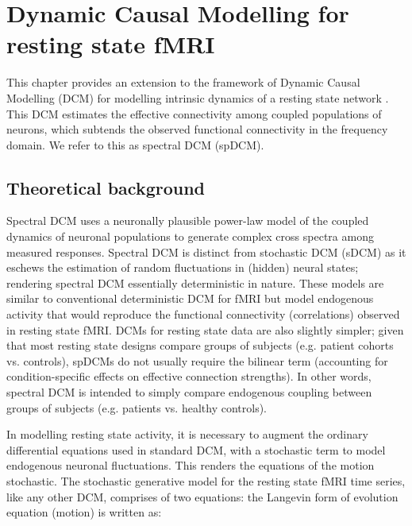 \chapter{Dynamic Causal Modelling for resting state fMRI \label{Chap:DCM_rsfmri}}

This chapter provides an extension to the framework of Dynamic Causal Modelling (DCM) for modelling intrinsic dynamics of a resting state network \cite{rsDCM2014,rsDCM2015}. This DCM estimates the effective connectivity among coupled populations of neurons, which subtends the observed functional connectivity in the frequency domain. We refer to this as spectral DCM (spDCM).

\section{Theoretical background}
Spectral DCM uses a neuronally plausible power-law model of the coupled dynamics of neuronal populations to generate complex cross spectra among measured responses. Spectral DCM is distinct from stochastic DCM (sDCM) \cite{stocDCM2011} as it eschews the estimation of random fluctuations in (hidden) neural states; rendering spectral DCM essentially deterministic in nature. These models are similar to conventional deterministic DCM for fMRI \cite{dcm} but model endogenous activity that would reproduce the functional connectivity (correlations) observed in resting state fMRI. DCMs for resting state data are also slightly simpler; given that most resting state designs compare groups of subjects (e.g. patient cohorts vs. controls), spDCMs do not usually require the bilinear term (accounting for condition-specific effects on effective connection strengths). In other words, spectral DCM is intended to simply compare endogenous coupling between groups of subjects (e.g. patients vs. healthy controls).

In modelling resting state activity, it is necessary to augment the ordinary differential equations used in standard DCM, with a stochastic term to model endogenous neuronal fluctuations. This renders the equations of the motion stochastic. The stochastic generative model for the resting state fMRI time series, like any other DCM, comprises of two equations: the Langevin form of evolution equation (motion) is written as:

